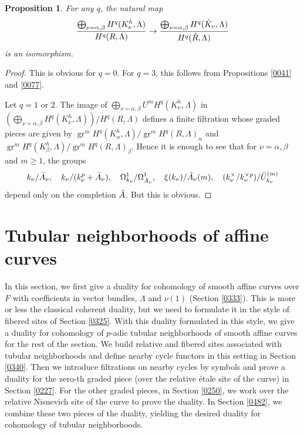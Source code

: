 \documentclass{amsart}
\newtheorem{Prop}[Thm]{Proposition}
\theoremstyle{remark}
\numberwithin{equation}{subsection}
\DeclareMathOperator{\gr}{gr}
\begin{document}
\begin{Prop} \label{0078}
	For any $q$, the natural map
		\[
				\frac{
					\bigoplus_{\nu = \alpha, \beta}
						H^{q}(K_{\nu}^{h}, \Lambda)
				}{
					H^{q}(R, \Lambda)
				}
			\to
				\frac{
					\bigoplus_{\nu = \alpha, \beta}
						H^{q}(\Hat{K}_{\nu}, \Lambda)
				}{
					H^{q}(\Hat{R}, \Lambda)
				}
		\]
	is an isomorphism.
\end{Prop}

\begin{proof}
	This is obvious for $q = 0$.
	For $q = 3$, this follows from
	Propositions \ref{0041}
	and \ref{0077}.
	
	Let $q = 1$ or $2$.
	The image of $\bigoplus_{\nu = \alpha, \beta} U^{m} H^{q}(K_{\nu}^{h}, \Lambda)$
	in
		$
			(
				\bigoplus_{\nu = \alpha, \beta}
					H^{q}(K_{\nu}^{h}, \Lambda)
			) / H^{q}(R, \Lambda)
		$
	defines a finite filtration whose graded pieces are given by
	$\gr^{m} H^{q}(K_{\alpha}^{h}, \Lambda) / \gr^{m} H^{q}(R, \Lambda)_{\alpha}$
	and $\gr^{m} H^{q}(K_{\beta}^{h}, \Lambda) / \gr^{m} H^{q}(R, \Lambda)_{\beta}$.
	Hence it is enough to see that for $\nu = \alpha, \beta$ and $m \ge 1$, the groups
		\[
				k_{\nu} / \Bar{A}_{\nu},
			\quad
				k_{\nu} / (k_{\nu}^{p} + \Bar{A}_{\nu}),
			\quad
				\Omega_{k_{\nu}}^{1} / \Omega_{\Bar{A}_{\nu}}^{1},
			\quad
				\xi(k_{\nu}) / \Tilde{A}_{\nu}(m),
			\quad
				(k_{\nu}^{\times} / k_{\nu}^{\times p}) / \Tilde{U}_{k_{\nu}}^{(m)}
		\]
	depend only on the completion $\Hat{A}$.
	But this is obvious.
\end{proof}


\section{Tubular neighborhoods of affine curves}
\label{0217}

In this section,
we first give a duality for cohomology of smooth affine curves over $F$
with coefficients in vector bundles, $\Lambda$ and $\nu(1)$
(Section \ref{0333}).
This is more or less the classical coherent duality,
but we need to formulate it
in the style of fibered sites of Section \ref{0325}.
With this duality formulated in this style,
we give a duality for cohomology of $p$-adic tubular neighborhoods of smooth affine curves
for the rest of the section.
We build relative and fibered sites associated with tubular neighborhoods
and define nearby cycle functors in this setting
in Section \ref{0340}.
Then we introduce filtrations on nearby cycles by symbols
and prove a duality for the zero-th graded piece (over the relative \'etale site of the curve)
in Section \ref{0227}.
For the other graded pieces, in Section \ref{0250},
we work over the relative Nisnevich site of the curve to prove the duality.
In Section \ref{0482},
we combine these two pieces of the duality,
yielding the desired duality for cohomology of tubular neighborhoods.
\end{document}
